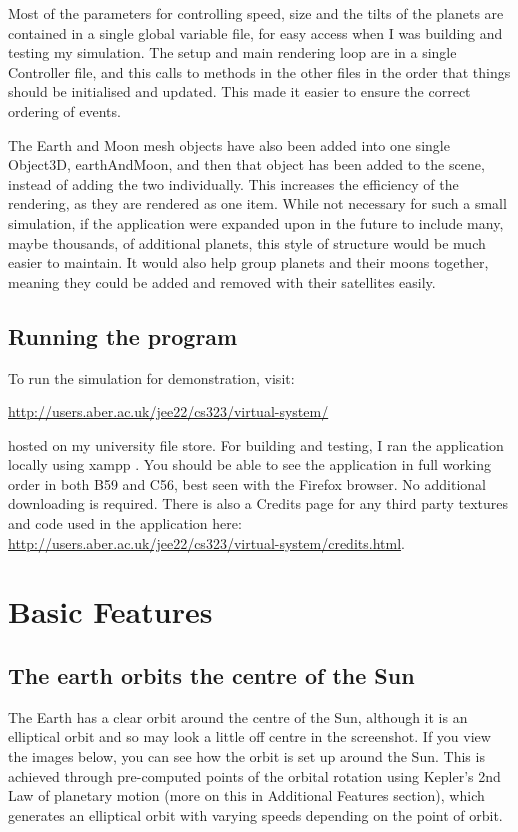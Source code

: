 \documentclass[12pt]{article}
\begin{document}
Most of the parameters for controlling speed, size and the tilts of the planets are contained in a single global variable file, for easy access when I was building and testing my simulation. The setup and main rendering loop are in a single Controller file, and this calls to methods in the other files in the order that things should be initialised and updated. This made it easier to ensure the correct ordering of events.

The Earth and Moon mesh objects have also been added into one single Object3D, earthAndMoon, and then that object has been added to the scene, instead of adding the two individually. This increases the efficiency of the rendering, as they are rendered as one item. While not necessary for such a small simulation, if the application were expanded upon in the future to include many, maybe thousands, of additional planets, this style of structure would be much easier to maintain. It would also help group planets and their moons together, meaning they could be added and removed with their satellites easily.

\subsection{Running the program}
To run the simulation for demonstration, visit: 

\url{http://users.aber.ac.uk/jee22/cs323/virtual-system/}

hosted on my university file store. For building and testing, I ran the application locally using xampp\cite{xampp} . You should be able to see the application in full working order in both B59 and C56, best seen with the Firefox browser. No additional downloading is required. There is also a Credits page for any third party textures and code used in the application here: \url{http://users.aber.ac.uk/jee22/cs323/virtual-system/credits.html}.



\section{Basic Features}
\subsection{The earth orbits the centre of the Sun}
The Earth has a clear orbit around the centre of the Sun, although it is an elliptical orbit and so may look a little off centre in the screenshot. If you view the images below, you can see how the orbit is set up around the Sun. This is achieved through pre-computed points of the orbital rotation using Kepler's 2nd Law of planetary motion (more on this in Additional Features section), which generates an elliptical orbit with varying speeds depending on the point of orbit.
\end{document}
